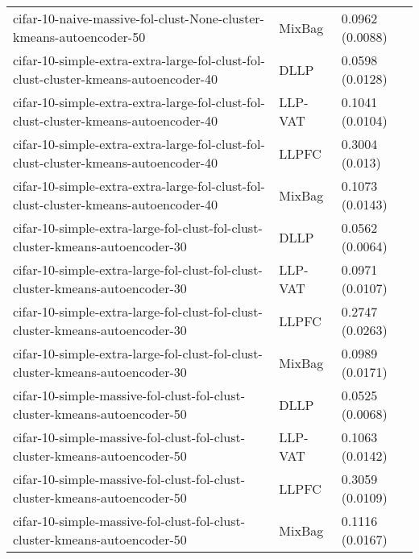 \begin{longtable}{lll}
                                          cifar-10-naive-massive-fol-clust-None-cluster-kmeans-autoencoder-50 &    MixBag &                       0.0962 (0.0088) \\
                          cifar-10-simple-extra-extra-large-fol-clust-fol-clust-cluster-kmeans-autoencoder-40 &      DLLP &                       0.0598 (0.0128) \\
                          cifar-10-simple-extra-extra-large-fol-clust-fol-clust-cluster-kmeans-autoencoder-40 &   LLP-VAT &                       0.1041 (0.0104) \\
                          cifar-10-simple-extra-extra-large-fol-clust-fol-clust-cluster-kmeans-autoencoder-40 &     LLPFC &                        0.3004 (0.013) \\
                          cifar-10-simple-extra-extra-large-fol-clust-fol-clust-cluster-kmeans-autoencoder-40 &    MixBag &                       0.1073 (0.0143) \\
                                cifar-10-simple-extra-large-fol-clust-fol-clust-cluster-kmeans-autoencoder-30 &      DLLP &                       0.0562 (0.0064) \\
                                cifar-10-simple-extra-large-fol-clust-fol-clust-cluster-kmeans-autoencoder-30 &   LLP-VAT &                       0.0971 (0.0107) \\
                                cifar-10-simple-extra-large-fol-clust-fol-clust-cluster-kmeans-autoencoder-30 &     LLPFC &                       0.2747 (0.0263) \\
                                cifar-10-simple-extra-large-fol-clust-fol-clust-cluster-kmeans-autoencoder-30 &    MixBag &                       0.0989 (0.0171) \\
                                    cifar-10-simple-massive-fol-clust-fol-clust-cluster-kmeans-autoencoder-50 &      DLLP &                       0.0525 (0.0068) \\
                                    cifar-10-simple-massive-fol-clust-fol-clust-cluster-kmeans-autoencoder-50 &   LLP-VAT &                       0.1063 (0.0142) \\
                                    cifar-10-simple-massive-fol-clust-fol-clust-cluster-kmeans-autoencoder-50 &     LLPFC &                       0.3059 (0.0109) \\
                                    cifar-10-simple-massive-fol-clust-fol-clust-cluster-kmeans-autoencoder-50 &    MixBag &                       0.1116 (0.0167) \\

\end{longtable}
